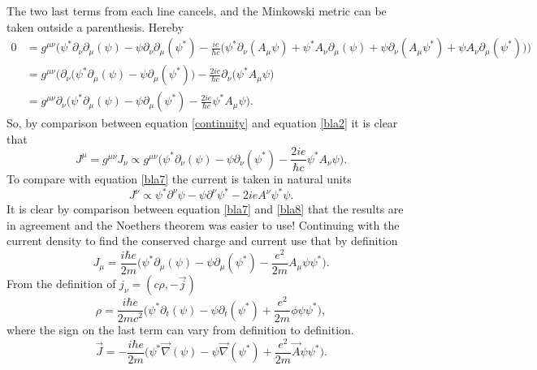 \begin{example}
\begin{equation}
	\end{equation} 
	The two last terms from each line cancels, and the Minkowski metric can be taken outside a parenthesis. Hereby
	\begin{equation}
		\begin{split}
			0&=g^{\mu\nu}\bigg(\psi^*\partial_\nu\partial_\mu(\psi)-\psi\partial_\nu\partial_\mu(\psi^*)-\frac{ie}{\hbar c}\bigg(\psi^*\partial_\nu(A_\mu\psi)+\psi^*A_\nu\partial_\mu(\psi)+\psi\partial_\nu(A_\mu\psi^*)+\psi A_\nu\partial_\mu(\psi^*)\bigg)\bigg)\\
			&=g^{\mu\nu}\bigg(\partial_\nu\bigg(\psi^*\partial_\mu(\psi)-\psi\partial_\mu(\psi^*)\bigg)-\frac{2ie}{\hbar c}\partial_\nu\bigg(\psi^*A_\mu\psi\bigg)\\
			&=g^{\mu\nu}\partial_\nu\bigg(\psi^*\partial_\mu(\psi)-\psi\partial_\mu(\psi^*)-\frac{2ie}{\hbar c}\psi^*A_\mu\psi\bigg).
		\end{split}
		\label{bla2}
	\end{equation} 
	So, by comparison between equation \ref{continuity} and equation \ref{bla2} it is clear that
	\begin{equation}
		J^\mu=g^{\mu\nu}J_{\nu}\propto g^{\mu\nu}\bigg(\psi^*\partial_\nu(\psi)-\psi\partial_\nu(\psi^*)-\frac{2ie}{\hbar c}\psi^*A_\nu\psi\bigg).
	\end{equation} 
	To compare with equation \ref{bla7} the current is taken in natural units
	\begin{equation}
		J^\nu\propto\psi^*\partial^\nu\psi-\psi\partial^\nu\psi^*-2ieA^\nu\psi^*\psi.
		\label{bla8}
	\end{equation} 
	It is clear by comparison between equation \ref{bla7} and \ref{bla8} that the results are in agreement and the Noethers theorem was easier to use! Continuing with the current density to find the conserved charge and current use that by definition
	\begin{equation}
		J_\mu=\frac{i\hbar e}{2m}\bigg(\psi^*\partial_\mu(\psi)-\psi\partial_\mu(\psi^*)-\frac{e^2}{2m}A_\mu\psi\psi^*\bigg).
	\end{equation} 
	From the definition of $j_\nu=(c\rho, -\vec{j})$
	\begin{equation}
		\rho=\frac{i\hbar e}{2mc^2}\bigg(\psi^*\partial_t(\psi)-\psi\partial_t(\psi^*)+\frac{e^2}{2m}\phi\psi\psi^*\bigg),
	\end{equation} 
	where the sign on the last term can vary from definition to definition.
	\begin{equation}
		\vec{J}=-\frac{i\hbar e}{2m}\bigg(\psi^*\vec{\nabla}(\psi)-\psi\vec{\nabla}(\psi^*)+\frac{e^2}{2m}\vec{A}\psi\psi^*\bigg).
	\end{equation} 
\end{example}


